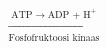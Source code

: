 \documentclass[preview]{standalone}
\begin{document}
\begin{align*}
\xrightarrow[\text{Fosfofruktoosi kinaas}]{\text{ATP} \rightarrow \text{ADP + H}^{+}}
\end{align*}
\end{document}
